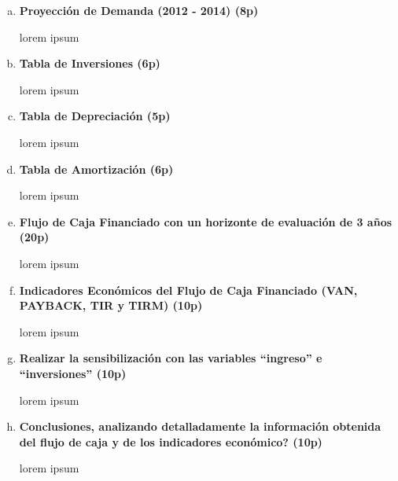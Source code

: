 \begin{enumerate}[(a)]

    \item {\bf Proyección de Demanda (2012 - 2014) (8p)}


          lorem ipsum

    \item {\bf Tabla de Inversiones (6p)}


          lorem ipsum

    \item {\bf Tabla de Depreciación (5p)}


          lorem ipsum

    \item {\bf Tabla de Amortización (6p)}


          lorem ipsum

    \item {\bf Flujo de Caja Financiado con un horizonte de evaluación de 3 años (20p)}


          lorem ipsum

    \item {\bf Indicadores Económicos  del Flujo de Caja Financiado (VAN, PAYBACK, TIR y TIRM) (10p)}


          lorem ipsum

    \item {\bf Realizar la sensibilización con las variables “ingreso” e “inversiones” (10p)}


          lorem ipsum

    \item {\bf Conclusiones, analizando detalladamente la información obtenida del flujo de caja y de los indicadores económico? (10p)}


          lorem ipsum

\end{enumerate}
